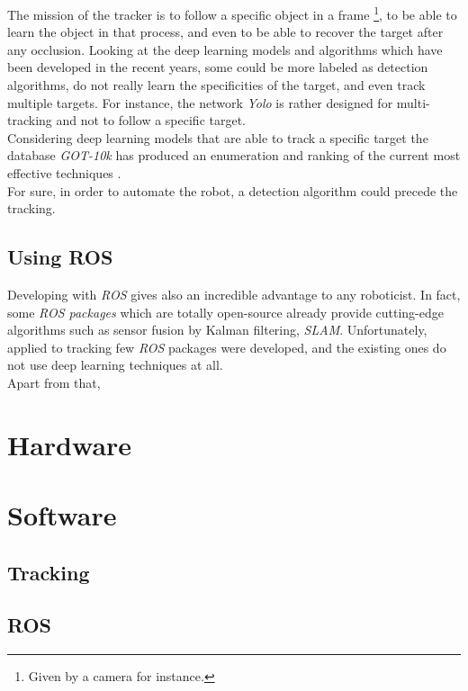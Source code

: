 		The mission of the tracker is to follow a specific object in a frame
		\footnote{Given by a camera for instance.}, to be able to 
		learn the object in that process, and even to be able to recover the target after 
		any occlusion. Looking at the deep learning models and algorithms 
		which have been developed in the recent years,
		some could be more labeled as detection algorithms, do not really learn the specificities 
		of the target, and even track multiple targets. For instance, the network \textit{Yolo} 
		\cite{bjelonicYolo2018} is rather designed for multi-tracking and 		not to follow a specific target. 
		\\\indent Considering deep learning models that are able to 
		track a specific target the database \textit{GOT-10k} has produced
		an enumeration and ranking of the current most effective techniques \cite{trakinglist}.
		\\\indent For sure, in order to automate the robot, a detection algorithm
		could precede the tracking.
		 
		
		\section{Using ROS}
		
		Developing with \textit{ROS} gives also an incredible
		advantage to any roboticist. In fact, some \textit{ROS packages}
		which are totally open-source already provide cutting-edge algorithms
		such as sensor fusion by Kalman filtering, \textit{SLAM}. Unfortunately, 
		applied to tracking few \textit{ROS} packages were developed, and
		the existing ones do not use deep learning techniques at all.
		\\\indent Apart from that, 
		
		
\chapter{Hardware}\label{hardware}

\chapter{Software}\label{software}

	\section{Tracking}\label{tracking}
	
	\section{ROS}\label{ros}